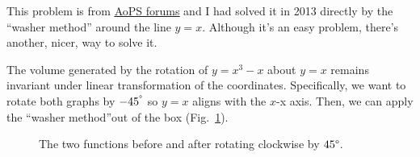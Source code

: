 \documentclass[a4paper]{article}
\begin{document}


%



\newpage

This problem is from \href{https://artofproblemsolving.com/community/c7h519876p2927714}{\underline{AoPS forums}} and I had solved it in 2013 directly by the ``washer method'' around the line $y=x$. Although it's an easy problem, there's another, nicer, way to solve it.

The volume generated by the rotation of  $y=x^3-x$ about $y=x$ remains invariant under linear transformation of the coordinates. Specifically, we want to rotate both graphs by $-45^\degree$ so $y=x$ aligns with the $x$-x axis. Then, we can apply the ``washer method''out of the box (Fig.~\ref{fig:plotsrotation}).

 \begin{figure}[H]
    \centering
    
    \caption{The two functions before and after rotating clockwise by $45\degree$.}
	 \label{fig:plotsrotation}
\end{figure}
\end{document}
